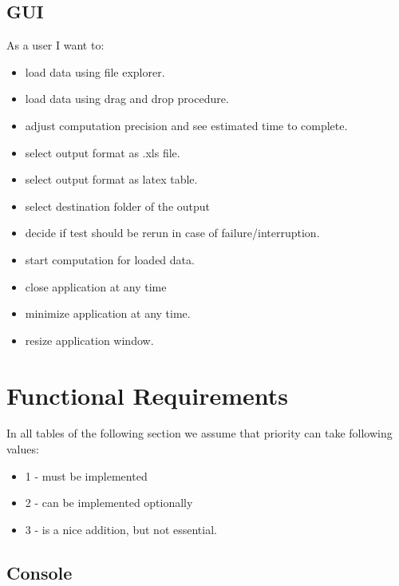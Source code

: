 \documentclass{article}
\begin{document}
\subsection{GUI}
As a user I want to:
\begin{itemize}
	\item
		load data using file explorer.
	\item
		load data using drag and drop procedure.
	\item
		adjust computation precision and see estimated time to complete.
	\item
		select output format as .xls file.
	\item
		select output format as latex table.
	\item
		select destination folder of the output
	\item
		decide if test should be rerun in case of failure/interruption.
	\item 
		start computation for loaded data.
	\item
		close application at any time
	\item
		minimize application at any time.
	\item 
		resize application window.
\end{itemize}



\newpage

\section{Functional Requirements}
In all tables of the following section we assume that priority can take following values:
\begin{itemize} 
	\item 1 - must be implemented
	\item 2 - can be implemented optionally 
	\item 3 - is a nice addition, but not essential.
\end{itemize} 


\subsection{Console} \label{console_func_req}
\end{document}
